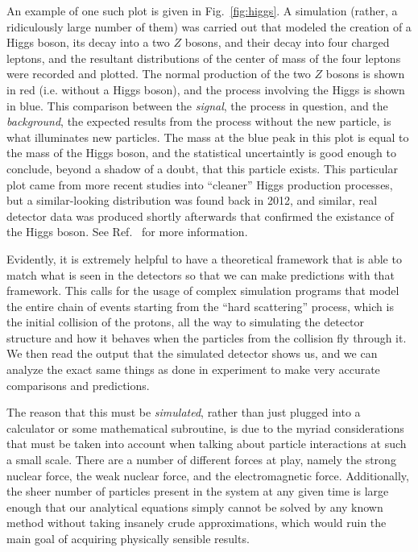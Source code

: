 An example of one such plot is given in Fig.~\ref{fig:higgs}. A simulation (rather, a ridiculously large number of them) was carried out that modeled the creation of a Higgs boson, its decay into a two $Z$ bosons, and their decay into four charged leptons, and the resultant distributions of the center of mass of the four leptons were recorded and plotted. The normal production of the two $Z$ bosons is shown in red (i.e. without a Higgs boson), and the process involving the Higgs is shown in blue. This comparison between the \textit{signal}, the process in question, and the \textit{background}, the expected results from the process without the new particle, is what illuminates new particles. The mass at the blue peak in this plot is equal to the mass of the Higgs boson, and the statistical uncertaintly is good enough to conclude, beyond a shadow of a doubt, that this particle exists. This particular plot came from more recent studies into ``cleaner'' Higgs production processes, but a similar-looking distribution was found back in 2012, and similar, real detector data was produced shortly afterwards that confirmed the existance of the Higgs boson. See Ref.~\cite{Aad_2020} for more information.

Evidently, it is extremely helpful to have a theoretical framework that is able to match what is seen in the detectors so that we can make predictions with that framework. This calls for the usage of complex simulation programs that model the entire chain of events starting from the ``hard scattering'' process, which is the initial collision of the protons, all the way to simulating the detector structure and how it behaves when the particles from the collision fly through it. We then read the output that the simulated detector shows us, and we can analyze the exact same things as done in experiment to make very accurate comparisons and predictions.

The reason that this must be \textit{simulated}, rather than just plugged into a calculator or some mathematical subroutine, is due to the myriad considerations that must be taken into account when talking about particle interactions at such a small scale. There are a number of different forces at play, namely the strong nuclear force, the weak nuclear force, and the electromagnetic force. Additionally, the sheer number of particles present in the system at any given time is large enough that our analytical equations simply cannot be solved by any known method without taking insanely crude approximations, which would ruin the main goal of acquiring physically sensible results.


